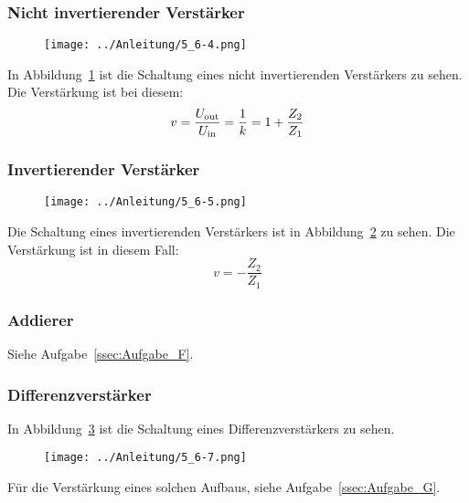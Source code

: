 \FloatBarrier
\subsubsection{Nicht invertierender Verstärker}

\begin{figure}[htbp]
	\centering
	\texttt{[image: ../Anleitung/5\_6-4.png]}
	\caption{%
		\cite[Abbildung~5/6.4]{physik313-Anleitung}
	}
	\label{fig:5_6-4}
\end{figure}

In Abbildung~\ref{fig:5_6-4} ist die Schaltung eines nicht invertierenden
Verstärkers zu sehen. Die Verstärkung ist bei diesem:
\[
    v = \frac{U_\text{out}}{U_\text{in}} = \frac 1k = 1 + \frac{Z_2}{Z_1}
\]

\FloatBarrier
\subsubsection{Invertierender Verstärker}

\begin{figure}[htbp]
	\centering
	\texttt{[image: ../Anleitung/5\_6-5.png]}
	\caption{%
		\cite[Abbildung~5/6.5]{physik313-Anleitung}
	}
	\label{fig:5_6-5}
\end{figure}

Die Schaltung eines invertierenden Verstärkers ist in
Abbildung~\ref{fig:5_6-5} zu sehen. Die Verstärkung ist in diesem Fall:
\[
    v = -\frac{Z_2}{Z_1}
\]

\FloatBarrier
\subsubsection{Addierer}

Siehe Aufgabe~\ref{ssec:Aufgabe_F}.

\FloatBarrier
\subsubsection{Differenzverstärker}

In Abbildung~\ref{fig:5_6-7} ist die Schaltung eines Differenzverstärkers zu
sehen.

\begin{figure}[htbp]
	\centering
	\texttt{[image: ../Anleitung/5\_6-7.png]}
	\caption{%
		\cite[Abbildung~5/6.7]{physik313-Anleitung}
	}
	\label{fig:5_6-7}
\end{figure}

Für die Verstärkung eines solchen Aufbaus, siehe Aufgabe~\ref{ssec:Aufgabe_G}.

